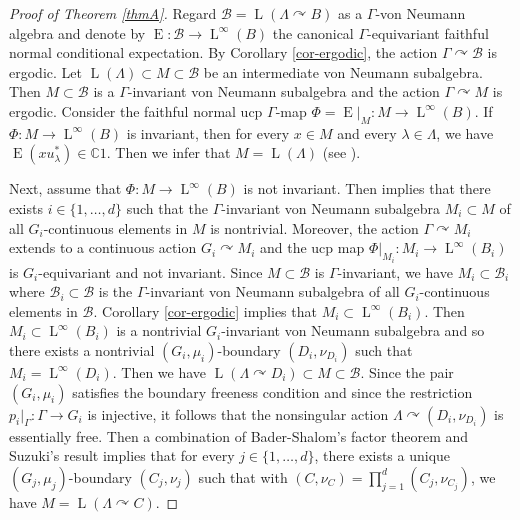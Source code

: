 \documentclass[JEP,XML,SOM,Unicode,published]{cedram}
\theoremstyle{definition}
\newcommand{\C}{\mathbb{C}}
\DeclareMathOperator{\rE}{ E}
\DeclareMathOperator{\rL}{L}
\begin{document}
\begin{proof}[Proof of Theorem \ref{thmA}]
Regard $\mathscr B = \rL(\Lambda \curvearrowright B)$ as a $\Gamma$-von Neumann algebra and denote by $\rE : \mathscr B \to \rL^\infty(B)$ the canonical $\Gamma$-equivariant faithful normal conditional expectation. By Corollary \ref{cor-ergodic}, the action $\Gamma \curvearrowright \mathscr B$ is ergodic. Let $\rL(\Lambda) \subset M \subset \mathscr B$ be an intermediate von Neumann subalgebra. Then $M \subset\mathscr B$ is a $\Gamma$-invariant von Neumann subalgebra and the action $\Gamma \curvearrowright M$ is ergodic. Consider the faithful normal ucp $\Gamma$-map $\Phi = \rE|_M : M \to \rL^\infty(B)$. If $\Phi : M \to \rL^\infty(B)$ is invariant, then for every $x \in M$ and every $\lambda \in \Lambda$, we have $\rE(x u_\lambda^*) \in \C 1$. Then we infer that $M = \rL(\Lambda)$ (see \eg \cite[Cor.\,3.4]{Su18}).

Next, assume that $\Phi : M \to \rL^\infty(B)$ is not invariant. Then \cite[Th.\,5.8]{BBHP20} implies that there exists $i \in \{1, \dots, d\}$ such that the $\Gamma$-invariant von Neumann subalgebra $M_i \subset M$ of all $G_i$-continuous elements in $M$ is nontrivial. Moreover, the action $\Gamma \curvearrowright M_i$ extends to a continuous action $G_i \curvearrowright M_i$ and the ucp map $\Phi|_{M_i} : M_i \to \rL^\infty(B_i)$ is $G_i$-equivariant and not invariant. Since $M \subset \mathscr B$ is $\Gamma$\nobreakdash-in\-vari\-ant, we have $M_i \subset \mathscr B_i$ where $\mathscr B_i \subset \mathscr B$ is the $\Gamma$-invariant von Neumann subalgebra of all $G_i$-continuous elements in $\mathscr B$. Corollary \ref{cor-ergodic} implies that $M_i \subset \rL^\infty(B_i)$. Then $M_i \subset \rL^\infty(B_i)$ is a nontrivial $G_i$-invariant von Neumann subalgebra and so there exists a nontrivial $(G_i, \mu_i)$-boundary $(D_i, \nu_{D_i})$ such that $M_i = \rL^\infty(D_i)$. Then we have $\rL(\Lambda \curvearrowright D_i) \subset M \subset \mathscr B$. Since the pair $(G_i, \mu_i)$ satisfies the boundary freeness condition and since the restriction $p_i |_\Gamma : \Gamma \to G_i$ is injective, it follows that the nonsingular action $\Lambda \curvearrowright (D_i, \nu_{D_i})$ is essentially free. Then a combination of Bader-Shalom's factor theorem \cite[Th.\,1.7]{BS04} and Suzuki's result \cite[Th.\,3.6]{Su18} implies that for every $j \in \{1, \dots, d\}$, there exists a unique $(G_j, \mu_j)$-boundary $(C_j, \nu_j)$ such that with $(C, \nu_C) = \prod_{j = 1}^d (C_j, \nu_{C_j})$, we have $M = \rL(\Lambda \curvearrowright C)$.
\end{proof}
\end{document}
